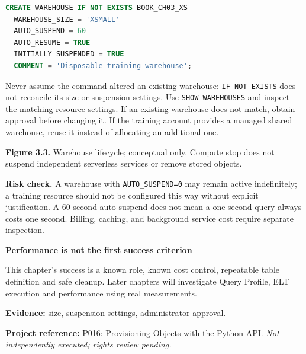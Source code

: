\documentclass[11pt,twoside]{article}
\newcommand{\repo}[2]{\par\begingroup\fontsize{8.0}{9.6}\selectfont\sffamily\color{inkgray}\textbf{Project reference:} \href{#2}{#1}. \textit{Not independently executed; rights review pending.}\par\endgroup}
\begin{document}
\begin{lstlisting}[language=SQL,caption={A bounded virtual warehouse with a suspended initial state.}]
CREATE WAREHOUSE IF NOT EXISTS BOOK_CH03_XS
  WAREHOUSE_SIZE = 'XSMALL'
  AUTO_SUSPEND = 60
  AUTO_RESUME = TRUE
  INITIALLY_SUSPENDED = TRUE
  COMMENT = 'Disposable training warehouse';
\end{lstlisting}
Never assume the command altered an existing warehouse: \texttt{IF NOT EXISTS} does not reconcile its size or suspension settings. Use \texttt{SHOW WAREHOUSES} and inspect the matching resource settings. If an existing warehouse does not match, obtain approval before changing it. If the training account provides a managed shared warehouse, reuse it instead of allocating an additional one.

\begin{center}
\end{center}
{\small\color{inkgray}\textbf{Figure 3.3.} Warehouse lifecycle; conceptual only. Compute stop does not suspend independent serverless services or remove stored objects.}\par
\textbf{Risk check.} A warehouse with \texttt{AUTO\_SUSPEND=0} may remain active indefinitely; a training resource should not be configured this way without explicit justification. A 60-second auto-suspend does not mean a one-second query always costs one second. Billing, caching, and background service cost require separate inspection.

\begin{insight}
\textbf{Performance is not the first success criterion}\par
This chapter's success is a known role, known cost control, repeatable table definition and safe cleanup. Later chapters will investigate Query Profile, ELT execution and performance using real measurements.
\end{insight}
\textbf{Evidence:} size, suspension settings, administrator approval.
\repo{P016: Provisioning Objects with the Python API}{https://github.com/Snowflake-Labs/sfguide-getting-started-snowflake-python-api}
\end{document}
